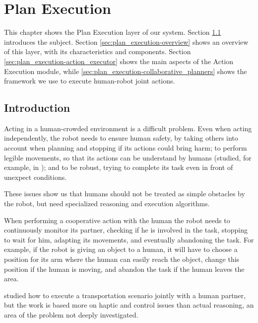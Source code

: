 
\chapter{Plan Execution} %

\label{chapter:plan_execution} %


This chapter shows the Plan Execution layer of our system. Section \ref{sec:plan_execution-intro} introduces the subject. Section \ref{sec:plan_execution-overview} shows an overview of this layer, with its characteristics and components. Section \ref{sec:plan_execution-action_executor} shows the main aspects of the Action Execution module, while \ref{sec:plan_execution-collaborative_planners} shows the framework we use to execute human-robot joint actions.


\section{Introduction}
\label{sec:plan_execution-intro}
Acting in a human-crowded environment is a difficult problem. Even when acting independently, the robot needs to ensure human safety, by taking others into account when planning and stopping if its actions could bring harm; to perform legible movements, so that its actions can be understand by humans (studied, for example, in \cite{dragan2013legibility}); and to be robust, trying to complete its task even in front of unexpect conditions. 

These issues show us that humans should not be treated as simple obstacles by the robot, but need specialized reasoning and execution algorithms.

When performing a cooperative action with the human the robot needs to continuously monitor its partner, checking if he is involved in the task, stopping to wait for him, adapting its movements, and eventually abandoning the task. For example, if the robot is giving an object to a human, it will have to choose a position for its arm where the human can easily reach the object, change this position if the human is moving, and abandon the task if the human leaves the area.

\cite{bussy2012proactive} studied how to execute a transportation scenario jointly with a human partner, but the work is based more on haptic and control issues than actual reasoning, an area of the problem not deeply investigated.

